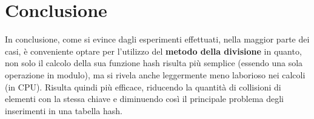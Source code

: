 \documentclass{article}
\begin{document}
\clearpage

\section{Conclusione}
In conclusione, come si evince dagli esperimenti effettuati, nella maggior parte dei casi, è conveniente optare per l’utilizzo del \textbf{metodo della divisione} in quanto, non solo il calcolo della sua funzione hash risulta più semplice (essendo una sola operazione in modulo), ma si rivela anche leggermente meno laborioso nei calcoli (in CPU). Risulta quindi più efficace, riducendo la quantità di collisioni di elementi con la stessa chiave e  diminuendo così il principale problema degli inserimenti in una tabella hash.
\end{document}
